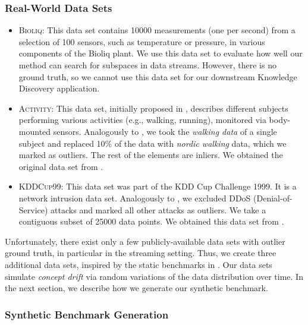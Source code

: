\subsubsection{Real-World Data Sets}

\begin{itemize}[noitemsep]
	\item \textsc{Bioliq:} This data set contains \num{10000} measurements (one per second) from a selection of 100 sensors, such as temperature or pressure, in various components of the \acrshort{Bioliq} plant. We use this data set to evaluate how well our method can search for subspaces in data streams. 
	However, there is no ground truth, so we cannot use this data set for our downstream Knowledge Discovery application. 
	\item \textsc{Activity:} This data set, initially proposed in \cite{DBLP:conf/iswc/ReissS12}, describes different subjects performing various activities (e.g., walking, running), monitored via body-mounted sensors. Analogously to \cite{DBLP:journals/kais/SatheA18}, we took the \textit{walking data} of a single subject and replaced 10\% of the data with \textit{nordic walking} data, which we marked as outliers. 
	The rest of the elements are inliers. We obtained the original data set from \cite{Dua:2019}. 
	\item \textsc{KDDCup99:} This data set was part of the KDD Cup Challenge 1999. It is a network intrusion data set. Analogously to \cite{DBLP:journals/kais/SatheA18}, we excluded DDoS (Denial-of-Service) attacks and marked all other attacks as outliers. 
	We take a contiguous subset of \num{25000} data points. 
	We obtained this data set from \cite{Dua:2019}. 
\end{itemize}
	
Unfortunately, there exist only a few  publicly-available data sets with outlier ground truth, in particular in the streaming setting. Thus, we create three additional data sets, inspired by the static benchmarks in \cite{DBLP:conf/icde/KellerMB12, DBLP:journals/ijdsa/TrittenbachB19}. Our data sets simulate \textit{concept drift} \cite{DBLP:conf/ictai/BarddalGE15} via random variations of the data distribution over time. In the next section, we describe how we generate our synthetic benchmark.  

\subsubsection{Synthetic Benchmark Generation}


